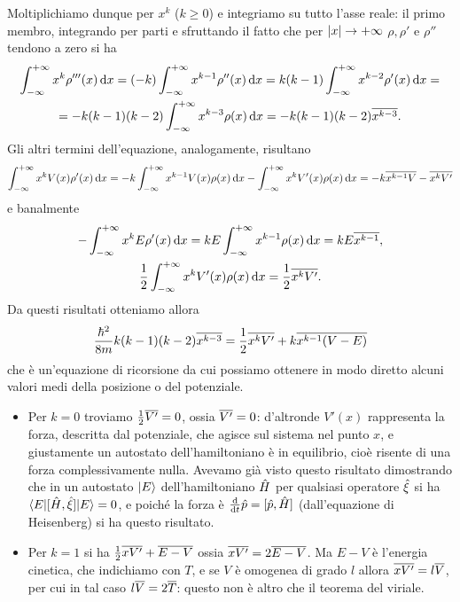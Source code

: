 Moltiplichiamo dunque per $x^k$ ($k\ge 0$) e integriamo su tutto l'asse reale: il primo membro, integrando per parti e sfruttando il fatto che per $\lvert x\rvert\to+\infty$ $\rho,\rho'$ e $\rho''$ tendono a zero si ha
\begin{multline}
	\int_{-\infty}^{+\infty}x^k\rho'''(x)\,\textup{d} x=
	(-k)\int_{-\infty}^{+\infty}x^{k-1}\rho''(x)\,\textup{d} x=
	k(k-1)\int_{-\infty}^{+\infty}x^{k-2}\rho'(x)\,\textup{d} x=\\=
	-k(k-1)(k-2)\int_{-\infty}^{+\infty}x^{k-3}\rho(x)\,\textup{d} x=
	-k(k-1)(k-2)\overline{x^{k-3}}.
\end{multline}
Gli altri termini dell'equazione, analogamente, risultano
\begin{equation}
	\int_{-\infty}^{+\infty}x^kV(x)\rho'(x)\,\textup{d} x=
	-k\int_{-\infty}^{+\infty}x^{k-1}V(x)\rho(x)\,\textup{d} x-\int_{-\infty}^{+\infty}x^kV'(x)\rho(x)\,\textup{d} x=
	-k\overline{x^{k-1}V}-\overline{x^{k}V'}
\end{equation}
e banalmente
\begin{equation}
	\begin{gathered}
		-\int_{-\infty}^{+\infty}x^kE\rho'(x)\,\textup{d} x=
			kE\int_{-\infty}^{+\infty}x^{k-1}\rho(x)\,\textup{d} x=
			kE\overline{x^{k-1}},\\
		\frac12\int_{-\infty}^{+\infty}x^kV'(x)\rho(x)\,\textup{d} x=
			\frac12\overline{x^kV'}.
	\end{gathered}
\end{equation}
Da questi risultati otteniamo allora
\begin{equation}
	\frac{\hbar^2}{8m}k(k-1)(k-2)\overline{x^{k-3}}=\frac12\overline{x^kV'}+k\overline{x^{k-1}(V-E)}
	\label{eq:ricorsione-momenti-pdf-posizione-unidimensionale}
\end{equation}
che è un'equazione di ricorsione da cui possiamo ottenere in modo diretto alcuni valori medi della posizione o del potenziale.
\begin{itemize}
	\item Per $k=0$ troviamo $\frac12\overline{V'}=0$, ossia $\overline{V'}=0$: d'altronde $V'(x)$ rappresenta la forza, descritta dal potenziale, che agisce sul sistema nel punto $x$, e giustamente un autostato dell'hamiltoniano è in equilibrio, cioè risente di una forza complessivamente nulla.
		Avevamo già visto questo risultato dimostrando che in un autostato $\lvert E\rangle$ dell'hamiltoniano $\hat{H}$ per qualsiasi operatore $\hat{\xi}$ si ha $\langle E\rvert[\hat{H},\hat{\xi}]\lvert E\rangle=0$, e poich\'e la forza è $\frac{\textup{d} {}}{\textup{d} {t}}\hat{p}=[\hat{p},\hat{H}]$ (dall'equazione di Heisenberg) si ha questo risultato.
	\item Per $k=1$ si ha $\frac12\overline{xV'}+\overline{E-V}$ ossia $\overline{xV'}=2\overline{E-V}$.
		Ma $E-V$ è l'energia cinetica, che indichiamo con $T$, e se $V$ è omogenea di grado $l$ allora $\overline{xV'}=l\overline{V}$, per cui in tal caso $l\overline{V}=2\overline{T}$: questo non è altro che il teorema del viriale.
\end{itemize}

